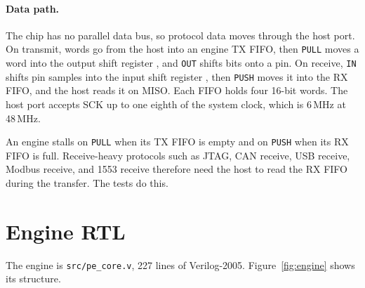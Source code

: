 \documentclass[11pt]{article}
\newcommand{\sig}[1]{\texttt{\detokenize{#1}}}
\begin{document}
\paragraph{Data path.}
The chip has no parallel data bus, so protocol data moves through the host port.
On transmit, words go from the host into an engine TX FIFO, then \texttt{PULL} moves a word into the output shift register \sig{osr}, and \texttt{OUT} shifts bits onto a pin.
On receive, \texttt{IN} shifts pin samples into the input shift register \sig{isr}, then \texttt{PUSH} moves it into the RX FIFO, and the host reads it on MISO.
Each FIFO holds four 16-bit words.
The host port accepts SCK up to one eighth of the system clock, which is 6\,MHz at 48\,MHz.

An engine stalls on \texttt{PULL} when its TX FIFO is empty and on \texttt{PUSH} when its RX FIFO is full.
Receive-heavy protocols such as JTAG, CAN receive, USB receive, Modbus receive, and 1553 receive therefore need the host to read the RX FIFO during the transfer.
The tests do this.

\section{Engine RTL}

The engine is \texttt{src/pe\_core.v}, 227 lines of Verilog-2005.
Figure~\ref{fig:engine} shows its structure.
\end{document}
